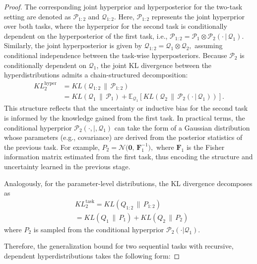 \documentclass[letterpaper]{article} %
\begin{document}
\begin{proof}
The corresponding joint hyperprior and hyperposterior for the two-task setting are denoted as $\mathcal{P}_{1:2}$ and $\mathcal{Q}_{1:2}$. Here, $\mathcal{P}_{1:2}$ represents the joint hyperprior over both tasks, where the hyperprior for the second task is conditionally dependent on the hyperposterior of the first task, i.e.,
$\mathcal{P}_{1:2} = \mathcal{P}_1 \otimes \mathcal{P}_2(\cdot\,|\,\mathcal{Q}_1).$
Similarly, the joint hyperposterior is given by
$\mathcal{Q}_{1:2} = \mathcal{Q}_1 \otimes \mathcal{Q}_2,$
assuming conditional independence between the task-wise hyperposteriors. Because $\mathcal{P}_2$ is conditionally dependent on $\mathcal{Q}_1$, the joint KL divergence between the hyperdistributions admits a chain-structured decomposition:
\begin{equation}
\begin{aligned}
    KL^{\text{hyper}}_2&=KL(\mathcal{Q}_{1:2}\,\|\,\mathcal{P}_{1:2})  \\
    &= KL(\mathcal{Q}_1\,\|\,\mathcal{P}_1) + \mathbb{E}_{\mathcal{Q}_1}\left[ KL(\mathcal{Q}_2\,\|\,\mathcal{P}_2(\cdot\,|\,\mathcal{Q}_1)) \right].
\end{aligned}
\end{equation}
This structure reflects that the uncertainty or inductive bias for the second task is informed by the knowledge gained from the first task. In practical terms, the conditional hyperprior $\mathcal{P}_2(\cdot,|,\mathcal{Q}_1)$ can take the form of a Gaussian distribution whose parameters (e.g., covariance) are derived from the posterior statistics of the previous task. For example,
$P_2 = \mathcal{N}\big(\mathbf{0},\, \mathbf{F}_1^{-1}\big),$
where $\mathbf{F}_1$ is the Fisher information matrix estimated from the first task, thus encoding the structure and uncertainty learned in the previous stage.


Analogously, for the parameter-level distributions, the KL divergence decomposes as
\begin{align*}
 &KL^{\text{task}}_2 =KL(Q_{1:2}\,\|\,P_{1:2})  \\
 &   = KL(Q_1\,\|\,P_1) + KL(Q_2\,\|\,P_2)
\end{align*}
where $P_2$ is sampled from the conditional hyperprior $\mathcal{P}_2(\cdot|\mathcal{Q}_1)$.



Therefore, the generalization bound for two sequential tasks with recursive, dependent hyperdistributions takes the following form:




\end{proof}
\end{document}
